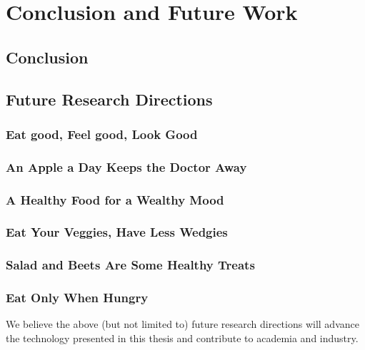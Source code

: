\chapter{Conclusion and Future Work}
\label{ch:concl}

\section{Conclusion}

\lipsum[1-3]

\section{Future Research Directions}

\lipsum[4]

\subsection{Eat good, Feel good, Look Good}

\lipsum[5]

\subsection{An Apple a Day Keeps the Doctor Away}

\lipsum[6]

\subsection{A Healthy Food for a Wealthy Mood}

\lipsum[7]

\subsection{Eat Your Veggies, Have Less Wedgies}

\lipsum[8]

\subsection{Salad and Beets Are Some Healthy Treats}

\lipsum[9]

\subsection{Eat Only When Hungry}

\lipsum[10]

\vspace{2em}
We believe the above (but not limited to) future research directions will advance the technology presented in this thesis and contribute to academia and industry.
